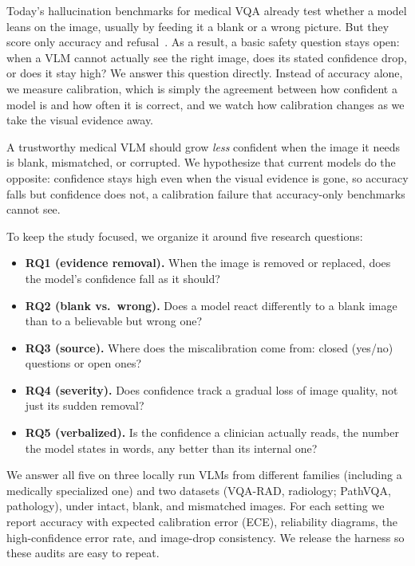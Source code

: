 \documentclass{article}
\begin{document}
Today's hallucination benchmarks for medical VQA already test whether a model
leans on the image, usually by feeding it a blank or a wrong picture. But they
score only accuracy and refusal~\cite{halt_medvqa, medvh}. As a result, a basic
safety question stays open: when a VLM cannot actually see the right image, does
its stated confidence drop, or does it stay high? We answer this question
directly. Instead of accuracy alone, we measure calibration, which is simply the
agreement between how confident a model is and how often it is correct, and we
watch how calibration changes as we take the visual evidence away.

\begin{hypobox}
\small
A trustworthy medical VLM should grow \emph{less} confident when the image it needs
is blank, mismatched, or corrupted. We hypothesize that current models do the
opposite: confidence stays high even when the visual evidence is gone, so accuracy
falls but confidence does not, a calibration failure that accuracy-only benchmarks
cannot see.
\end{hypobox}

To keep the study focused, we organize it around five research questions:
\begin{itemize}
  \item \textbf{RQ1 (evidence removal).} When the image is removed or replaced,
        does the model's confidence fall as it should?
  \item \textbf{RQ2 (blank vs.\ wrong).} Does a model react differently to a blank
        image than to a believable but wrong one?
  \item \textbf{RQ3 (source).} Where does the miscalibration come from: closed
        (yes/no) questions or open ones?
  \item \textbf{RQ4 (severity).} Does confidence track a gradual loss of image
        quality, not just its sudden removal?
  \item \textbf{RQ5 (verbalized).} Is the confidence a clinician actually reads,
        the number the model states in words, any better than its internal one?
\end{itemize}
We answer all five on three locally run VLMs from different families (including a medically
specialized one) and two datasets (VQA-RAD, radiology; PathVQA, pathology), under
intact, blank, and mismatched images. For each setting we report accuracy with
expected calibration error (ECE), reliability diagrams, the high-confidence error
rate, and image-drop consistency. We release the harness so these audits are easy
to repeat.
\end{document}
